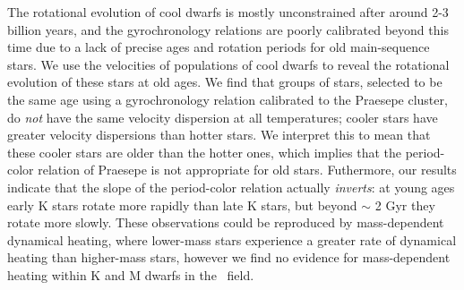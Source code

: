 
The rotational evolution of cool dwarfs is mostly unconstrained after around
2-3 billion years, and the gyrochronology relations are poorly calibrated
beyond this time due to a lack of precise ages and rotation periods for old
main-sequence stars.
We use the velocities of populations of cool dwarfs to reveal the rotational
evolution of these stars at old ages.
We find that groups of stars, selected to be the same age using a
gyrochronology relation calibrated to the Praesepe cluster, do {\it not} have
the same velocity dispersion at all temperatures; cooler stars have greater
velocity dispersions than hotter stars.
We interpret this to mean that these cooler stars are older than the hotter
ones, which implies that the period-color relation of Praesepe is not
appropriate for old stars.
Futhermore, our results indicate that the slope of the period-color relation
actually {\it inverts}: at young ages early K stars rotate more rapidly than
late K stars, but beyond $\sim$ 2 Gyr they rotate more slowly.
These observations could be reproduced by mass-dependent dynamical heating,
where lower-mass stars experience a greater rate of dynamical heating than
higher-mass stars, however we find no evidence for mass-dependent heating
within K and M dwarfs in the \kepler\ field.
